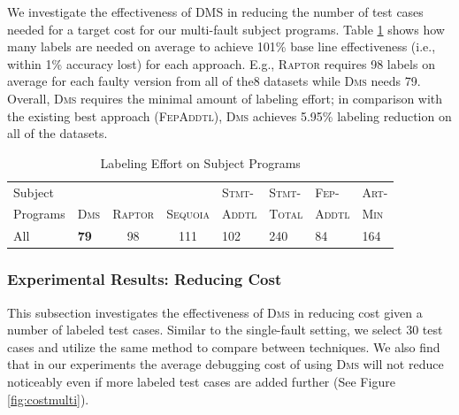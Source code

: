 We investigate the effectiveness of \textsc{DMS} in reducing the number of test cases needed for a target cost for our multi-fault subject programs. Table \ref{tab:label_effort2} shows how many labels are needed on average to achieve 101\% base line effectiveness (i.e., within 1\% accuracy lost) for each approach. E.g., \textsc{Raptor} requires 98 labels on average for each faulty version from all of the8 datasets while \textsc{Dms} needs 79. Overall, \textsc{Dms} requires the minimal amount of labeling effort; in comparison with the existing best approach (\textsc{FepAddtl}), \textsc{Dms} achieves 5.95\% labeling reduction on all of the datasets.

\begin{table}[!htbp]
	\centering
	\caption{Labeling Effort on Subject Programs}
{
	\scriptsize
		\renewcommand{\arraystretch}{1.5}
		\hspace{-10pt}
        \begin{tabular}{|m{29pt}|m{13pt}|c|c|m{21pt}|m{21pt}|m{21pt}|m{17pt}|}
		   \hline
		     Subject &             &                &           & \textsc{Stmt-} & \textsc{Stmt-} & \textsc{Fep-}  & \textsc{Art-} \\
		   Programs & \textsc{Dms} & \textsc{Raptor}  & \textsc{Sequoia} & \textsc{Addtl} & \textsc{Total} & \textsc{Addtl} & \textsc{Min} \\
		   \hline\hline
		   All &   {\bf 79} &         98 &      111 &       102 &     240 &         84 &      164 \\
		   \hline
		\end{tabular}
}
	\label{tab:label_effort2}
\end{table}


\subsubsection{Experimental Results: Reducing Cost}\label{sec.exp.resultsB2}

This subsection investigates the effectiveness of \textsc{Dms} in reducing cost given a number of labeled test cases. Similar to the single-fault setting, we select 30 test cases and utilize the same method to compare between techniques. We also find that in our experiments the average debugging cost of using \textsc{Dms} will not reduce noticeably even if more labeled test cases are added further (See Figure \ref{fig:costmulti}).


